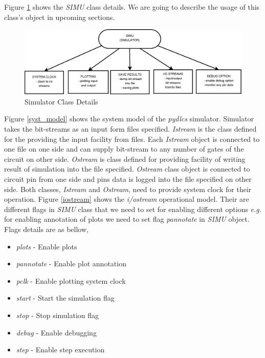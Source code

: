 \documentclass[a4paper,12pt]{article}
\begin{document}
Figure \ref{simu_class} shows the \emph{SIMU} class details. We are going to describe the usage of this class's object in upcoming sections.\\



\begin{figure}[!h]
   \begin{center}
   \includegraphics[scale=0.35]{simu_model.png}
    \caption{{Simulator Class Details}}
  \label{simu_class}
  \end{center}
  \end{figure}


Figure \ref{syst_model} shows the system model of the \emph{pydlcs} simulator. Simulator takes the bit-streams as an input form files specified. \emph{Istream} is the class defined for the providing the input facility from files. Each \emph{Istream} object is connected to one file on one side and can supply bit-stream to any number of gates of the circuit on other side. \emph{Ostream} is class defined for providing facility of writing result of simulation into the file specified. \emph{Ostream} class object is connected to circuit pin from one side and pins data is logged into the file specified on other side. Both classes, \emph{Istream} and \emph{Ostream}, need to provide system clock for their operation. Figure \ref{iostream} shows the \emph{i/ostream} operational model. Their are different flags in \emph{SIMU} class that we need to set for enabling different options \emph{e.g.} for enabling annotation  of plots we need to set flag \emph{pannotate} in \emph{SIMU} object. Flags details are as bellow,
\begin{itemize}
 \item \emph{plots} - Enable plots
 \item \emph{pannotate} - Enable plot annotation
 \item \emph{pclk} - Enable plotting system clock
 \item \emph{start} - Start the simulation flag
 \item \emph{stop} - Stop simulation flag
 \item \emph{debug} - Enable debugging
 \item \emph{step} - Enable step execution
\end{itemize}
\end{document}
